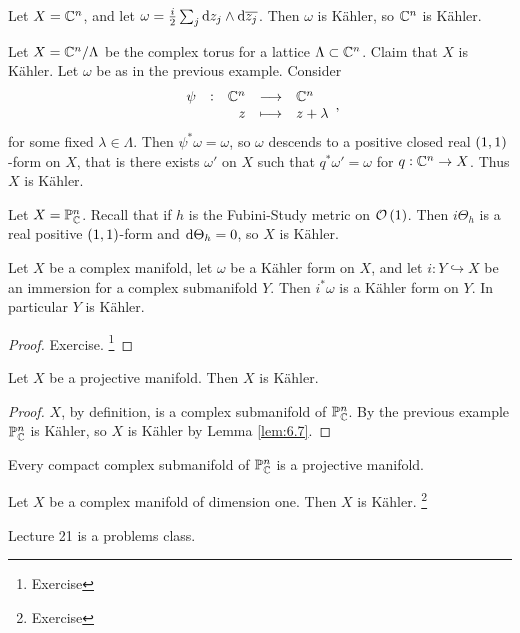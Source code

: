 \begin{example}
Let $ X = \mathbb{C}^n $, and let $ \omega = \tfrac{i}{2}\sum_j \mathrm{d} z_j \wedge \mathrm{d}\overline{z_j} $. Then $ \omega $ is K\"ahler, so $ \mathbb{C}^n $ is K\"ahler.
\end{example}

\begin{example}
Let $ X = \mathbb{C}^n / \Lambda $ be the complex torus for a lattice $ \Lambda \subset \mathbb{C}^n $. Claim that $ X $ is K\"ahler. Let $ \omega $ be as in the previous example. Consider
$$ \function[\psi]{\CC^n}{\CC^n}{z}{z + \lambda}, $$
for some fixed $ \lambda \in \Lambda $. Then $ \psi^*\omega = \omega $, so $ \omega $ descends to a positive closed real $ \br{1, 1} $-form on $ X $, that is there exists $ \omega' $ on $ X $ such that $ q^*\omega' = \omega $ for $ q : \mathbb{C}^n \to X $. Thus $ X $ is K\"ahler.
\end{example}

\begin{example}
Let $ X = \mathbb{P}_{\mathbb{C}}^n $. Recall that if $ h $ is the Fubini-Study metric on $ \OOO\br{1} $. Then $ i\Theta_h $ is a real positive $ \br{1, 1} $-form and $ \mathrm{d}\Theta_h = 0 $, so $ X $ is K\"ahler.
\end{example}

\begin{lemma}
\label{lem:6.7}
Let $ X $ be a complex manifold, let $ \omega $ be a K\"ahler form on $ X $, and let $ i : Y \hookrightarrow X $ be an immersion for a complex submanifold $ Y $. Then $ i^*\omega $ is a K\"ahler form on $ Y $. In particular $ Y $ is K\"ahler.
\end{lemma}

\begin{proof}
Exercise. \footnote{Exercise}
\end{proof}

\begin{corollary}
Let $ X $ be a projective manifold. Then $ X $ is K\"ahler.
\end{corollary}

\begin{proof}
$ X $, by definition, is a complex submanifold of $ \mathbb{P}_{\mathbb{C}}^n $. By the previous example $ \mathbb{P}_{\mathbb{C}}^n $ is K\"ahler, so $ X $ is K\"ahler by Lemma \ref{lem:6.7}.
\end{proof}

\begin{fact*}
Every compact complex submanifold of $ \mathbb{P}_{\mathbb{C}}^n $ is a projective manifold.
\end{fact*}

\begin{example*}
Let $ X $ be a complex manifold of dimension one. Then $ X $ is K\"ahler. \footnote{Exercise}
\end{example*}


Lecture 21 is a problems class.

